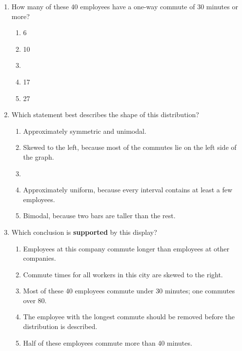 \documentclass[12pt]{article}
\begin{document}
\vspace{0.10in}

\begin{enumerate}[leftmargin=1.9em, itemsep=0.11in]

  \item How many of these 40 employees have a one-way commute of 30 minutes or more?
        \begin{enumerate}[label=\textbf{(\Alph*)}, leftmargin=2.2em, itemsep=2pt]
          \item 6
          \item 10
          \item {}
          \item 17
          \item 27
                \hfill{}
        \end{enumerate}

  \item Which statement best describes the shape of this distribution?
        \begin{enumerate}[label=\textbf{(\Alph*)}, leftmargin=2.2em, itemsep=2pt]
          \item Approximately symmetric and unimodal.
          \item Skewed to the left, because most of the commutes lie on the left side of the
                graph.
          \item {}
          \item Approximately uniform, because every interval contains at least a few employees.
          \item Bimodal, because two bars are taller than the rest.
                \hfill{}
        \end{enumerate}

  \boxguard[10]
  \item Which conclusion is \textbf{supported} by this display?
        \begin{enumerate}[label=\textbf{(\Alph*)}, leftmargin=2.2em, itemsep=2pt]
          \item Employees at this company commute longer than employees at other companies.
          \item Commute times for all workers in this city are skewed to the right.
          \item \textcolor{keyred}{Most of these 40 employees commute under 30 minutes; one commutes over 80.}  %
          \item The employee with the longest commute should be removed before the distribution
                is described.
          \item Half of these employees commute more than 40 minutes.
                \hfill{}
        \end{enumerate}


\end{enumerate}
\end{document}

